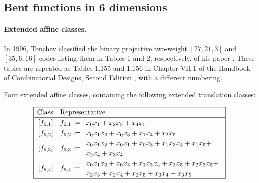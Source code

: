 \documentclass[12pt,a4paper]{article}
\begin{document}
\subsection{Bent functions in 6 dimensions}
\paragraph*{Extended affine classes.}

In 1996, Tonchev classified the binary projective two-weight $[27,21,3]$ and $[35,6,16]$ codes
listing them in Tables 1 and 2, respectively, of his paper \cite{Ton96uniformly}.
These tables are repeated as Tables 1.155 and 1.156 in Chapter VII.1 of the Handbook of
Combinatorial Designs, Second Edition \cite{Ton07codes},
with a different numbering.

Four extended affine classes, containing the following extended translation classes:

\begin{align*}
\def\arraystretch{1.2}
\begin{array}{|cl|}
\hline
\text{Class} &
\text{Representative}
\\
\hline
\,[f_{6,1}] & f_{6,1} :=
\begin{array}{l}
x_{0} x_{1} + x_{2} x_{3} + x_{4} x_{5}
\end{array}
\\
\,[f_{6,2}] & f_{6,2} :=
\begin{array}{l}
x_{0} x_{1} x_{2} + x_{0} x_{3} + x_{1} x_{4} + x_{2} x_{5}
\end{array}
\\
\,[f_{6,3}] & f_{6,3} :=
\begin{array}{l}
x_{0} x_{1} x_{2} + x_{0} x_{1} + x_{0} x_{3} + x_{1} x_{3} x_{4} + x_{1} x_{5} +
\\
x_{2} x_{4} + x_{3} x_{4}
\end{array}
\\
\,[f_{6,4}] & f_{6,4} :=
\begin{array}{l}
x_{0} x_{1} x_{2} + x_{0} x_{3} + x_{1} x_{3} x_{4} + x_{1} x_{5} + x_{2} x_{3} x_{5} +
\\
x_{2} x_{3} + x_{2} x_{4} + x_{2} x_{5} + x_{3} x_{4} + x_{3} x_{5}
\end{array}
\\
\hline
\end{array}
\end{align*}
\end{document}
